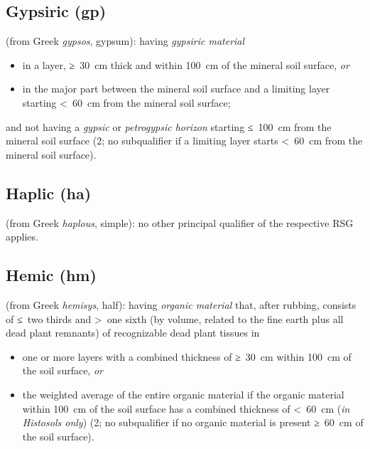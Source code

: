 \documentclass[
  letterpaper,
  DIV=11,
  numbers=noendperiod]{scrreprt}
\providecommand{\tightlist}{%
  \setlength{\itemsep}{0pt}\setlength{\parskip}{0pt}}\usepackage{longtable,booktabs,array}
\begin{document}
\hypertarget{gypsiric-gp}{%
\subsection{Gypsiric (gp)}\label{gypsiric-gp}}

(from Greek \emph{gypsos}, gypsum): having \emph{gypsiric material}

\begin{itemize}
\item
  in a layer, ≥~30~cm thick and within 100~cm of the mineral soil
  surface, \emph{or}
\item
  in the major part between the mineral soil surface and a limiting
  layer starting \textless~60~cm from the mineral soil surface;
\end{itemize}

and not having a \emph{gypsic} or \emph{petrogypsic horizon} starting
≤~100~cm from the mineral soil surface (2; no subqualifier if a limiting
layer starts \textless~60~cm from the mineral soil surface).

\hypertarget{haplic-ha}{%
\subsection{Haplic (ha)}\label{haplic-ha}}

(from Greek \emph{haplous}, simple): no other principal qualifier of the
respective RSG applies.

\hypertarget{hemic-hm}{%
\subsection{Hemic (hm)}\label{hemic-hm}}

(from Greek \emph{hemisys}, half): having \emph{organic material} that,
after rubbing, consists of ≤~two thirds and \textgreater~one sixth (by
volume, related to the fine earth plus all dead plant remnants) of
recognizable dead plant tissues in

\begin{itemize}
\tightlist
\item
  one or more layers with a combined thickness of ≥~30~cm within 100~cm
  of the soil surface, \emph{or}
\item
  the weighted average of the entire organic material if the organic
  material within 100~cm of the soil surface has a combined thickness of
  \textless~60~cm (\emph{in Histosols only}) (2; no subqualifier if no
  organic material is present ≥~60~cm of the soil surface).
\end{itemize}
\end{document}
